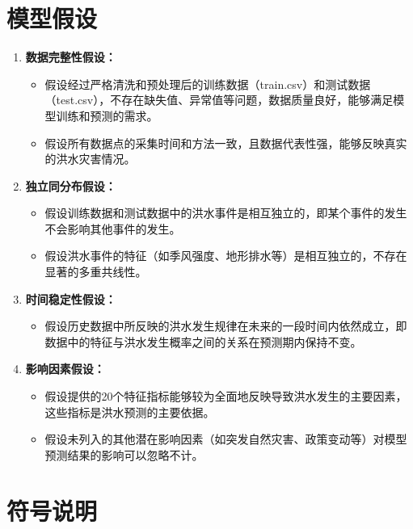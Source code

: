 \documentclass[withoutpreface,bwprint]{cumcmthesis} %
\begin{document}
\section{模型假设}
\begin{enumerate}
\item \textbf{数据完整性假设：}
\begin{itemize}
	\item 假设经过严格清洗和预处理后的训练数据（train.csv）和测试数据（test.csv），不存在缺失值、异常值等问题，数据质量良好，能够满足模型训练和预测的需求。
	\item 假设所有数据点的采集时间和方法一致，且数据代表性强，能够反映真实的洪水灾害情况。
\end{itemize}

\item \textbf{独立同分布假设：}
\begin{itemize}
	\item 假设训练数据和测试数据中的洪水事件是相互独立的，即某个事件的发生不会影响其他事件的发生。
	\item 假设洪水事件的特征（如季风强度、地形排水等）是相互独立的，不存在显著的多重共线性。
\end{itemize}

\item \textbf{时间稳定性假设：}
\begin{itemize}
	\item 假设历史数据中所反映的洪水发生规律在未来的一段时间内依然成立，即数据中的特征与洪水发生概率之间的关系在预测期内保持不变。
\end{itemize}

\item \textbf{影响因素假设：}
\begin{itemize}
	\item 假设提供的20个特征指标能够较为全面地反映导致洪水发生的主要因素，这些指标是洪水预测的主要依据。
	\item 假设未列入的其他潜在影响因素（如突发自然灾害、政策变动等）对模型预测结果的影响可以忽略不计。
\end{itemize}
\end{enumerate}

\section{符号说明}
\end{document}
